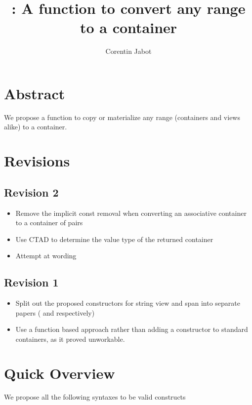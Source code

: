 \documentclass{wg21}
\title{\tcode{ranges::to}: A function to convert any range to a container}
\author{Corentin Jabot}{corentin.jabot@gmail.com}
\begin{document}
\maketitle

\section{Abstract}

We propose a function to copy or materialize any range (containers and views alike) to a container.

\section{Revisions}

\subsection*{Revision 2}
\begin{itemize}
	\item Remove the implicit const removal when converting an associative container to a container of pairs
	\item Use CTAD to determine the value type of the returned container
	\item Attempt at wording
\end{itemize}

\subsection*{Revision 1}
\begin{itemize}
	\item Split out the proposed constructors for string view and span into separate papers (\cite{P1391} and \cite{P1394} respectively)
	\item Use a function based approach rather than adding a constructor to standard containers, as it proved unworkable.
\end{itemize}
\newpage
\section{Quick Overview}
We propose all the following syntaxes to be valid constructs
\end{document}
